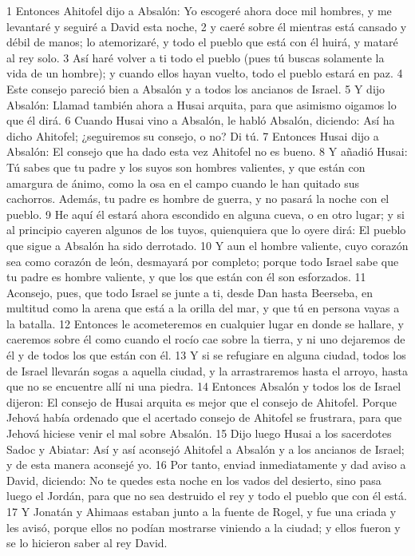 1 Entonces Ahitofel dijo a Absalón: Yo escogeré ahora doce mil hombres, y me levantaré y seguiré a David esta noche,
2 y caeré sobre él mientras está cansado y débil de manos; lo atemorizaré, y todo el pueblo que está con él huirá, y mataré al rey solo.
3 Así haré volver a ti todo el pueblo (pues tú buscas solamente la vida de un hombre); y cuando ellos hayan vuelto, todo el pueblo estará en paz.
4 Este consejo pareció bien a Absalón y a todos los ancianos de Israel.
5 Y dijo Absalón: Llamad también ahora a Husai arquita, para que asimismo oigamos lo que él dirá.
6 Cuando Husai vino a Absalón, le habló Absalón, diciendo: Así ha dicho Ahitofel; ¿seguiremos su consejo, o no? Di tú.
7 Entonces Husai dijo a Absalón: El consejo que ha dado esta vez Ahitofel no es bueno.
8 Y añadió Husai: Tú sabes que tu padre y los suyos son hombres valientes, y que están con amargura de ánimo, como la osa en el campo cuando le han quitado sus cachorros. Además, tu padre es hombre de guerra, y no pasará la noche con el pueblo.
9 He aquí él estará ahora escondido en alguna cueva, o en otro lugar; y si al principio cayeren algunos de los tuyos, quienquiera que lo oyere dirá: El pueblo que sigue a Absalón ha sido derrotado.
10 Y aun el hombre valiente, cuyo corazón sea como corazón de león, desmayará por completo; porque todo Israel sabe que tu padre es hombre valiente, y que los que están con él son esforzados.
11 Aconsejo, pues, que todo Israel se junte a ti, desde Dan hasta Beerseba, en multitud como la arena que está a la orilla del mar, y que tú en persona vayas a la batalla.
12 Entonces le acometeremos en cualquier lugar en donde se hallare, y caeremos sobre él como cuando el rocío cae sobre la tierra, y ni uno dejaremos de él y de todos los que están con él.
13 Y si se refugiare en alguna ciudad, todos los de Israel llevarán sogas a aquella ciudad, y la arrastraremos hasta el arroyo, hasta que no se encuentre allí ni una piedra.
14 Entonces Absalón y todos los de Israel dijeron: El consejo de Husai arquita es mejor que el consejo de Ahitofel. Porque Jehová había ordenado que el acertado consejo de Ahitofel se frustrara, para que Jehová hiciese venir el mal sobre Absalón.
15 Dijo luego Husai a los sacerdotes Sadoc y Abiatar: Así y así aconsejó Ahitofel a Absalón y a los ancianos de Israel; y de esta manera aconsejé yo.
16 Por tanto, enviad inmediatamente y dad aviso a David, diciendo: No te quedes esta noche en los vados del desierto, sino pasa luego el Jordán, para que no sea destruido el rey y todo el pueblo que con él está.
17 Y Jonatán y Ahimaas estaban junto a la fuente de Rogel, y fue una criada y les avisó, porque ellos no podían mostrarse viniendo a la ciudad; y ellos fueron y se lo hicieron saber al rey David.
